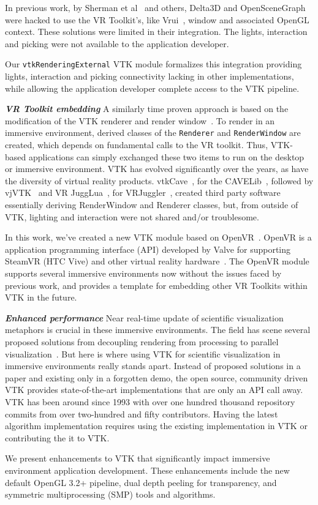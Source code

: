 In previous work, by Sherman et al~\cite{Sherman:2010} and others, Delta3D and OpenSceneGraph were hacked to use the VR Toolkit's, like Vrui~\cite{Kreylos:2006}, window and associated OpenGL context. These solutions were limited in their integration. The lights, interaction and picking were not available to the application developer.

Our \texttt{vtkRenderingExternal} VTK module formalizes this integration providing lights, interaction and picking connectivity lacking in other implementations, while allowing the application developer complete access to the VTK pipeline.

\textbf{\textit{VR Toolkit embedding}} A similarly time proven approach is based on the modification of the VTK renderer and render window~\cite{van2000vista, Hannema:2001, Shamonin02vtkcave, Belleman:2003}. To render in an immersive environment, derived classes of the \texttt{Renderer} and \texttt{RenderWindow} are created, which depends on fundamental calls to the VR toolkit. Thus, VTK-based applications can simply exchanged these two items to run on the desktop or immersive environment. VTK has evolved significantly over the years, as have the diversity of virtual reality products. vtkCave~\cite{Tufo:1999}, for the CAVELib~\cite{CAVELib:2016}, followed by vjVTK~\cite{Blom:2006} and VR JuggLua~\cite{Pavlik:2012}, for VRJuggler~\cite{Bierbaum:2001}, created third party software essentially deriving RenderWindow and Renderer classes, but, from outside of VTK, lighting and interaction were not shared and/or troublesome.

In this work, we've created a new VTK module based on OpenVR~\cite{OpenVR:2016}. OpenVR is a application programming interface (API) developed by Valve for supporting  SteamVR (HTC Vive) and other virtual reality hardware~\cite{Road2VR:2015}. The OpenVR module supports several immersive environments now without the issues faced by previous work, and provides a template for embedding other VR Toolkits within VTK in the future.

\textit{\textbf{Enhanced performance}} Near real-time update of scientific visualization metaphors is crucial in these immersive environments. The field has scene several proposed solutions from decoupling rendering from processing to parallel visualization~\cite{Bryson:1996, vanReimersdahl:2000}. But here is where using VTK for scientific visualization in immersive environments really stands apart. Instead of proposed solutions in a paper and existing only in a forgotten demo, the open source, community driven VTK provides state-of-the-art implementations that are only an API call away. VTK has been around since 1993 with over one hundred thousand repository commits from over two-hundred and fifty contributors. Having the latest algorithm implementation requires using the existing implementation in VTK or contributing the it to VTK.

We present enhancements to VTK that significantly impact immersive environment application development. These enhancements include the new default OpenGL 3.2+ pipeline, dual depth peeling for transparency, and symmetric multiprocessing (SMP) tools and algorithms.